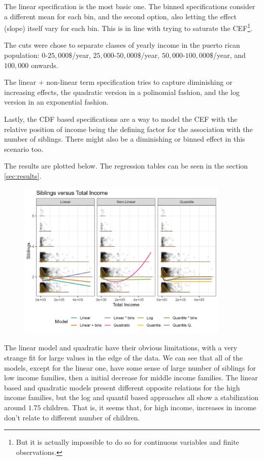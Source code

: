 \documentclass[12pt]{article}
\begin{document}
The linear specification is the most basic one. The binned specifications consider a different mean for each bin, and the second option, also letting the effect (slope) itself vary for each bin. This is in line with trying to saturate the CEF\footnote{But it is actually impossible to do so for continuous variables and finite observations.}.

The cuts were chose to separate classes of yearly income in the puerto rican population: $0$-$25,000\$$/year, $25,000$-$50,000\$$/year, $50,000$-$100,000\$$/year, and $100,000$ onwards.

The linear + non-linear term specification tries to capture diminishing or increasing effects, the quadratic version in a polinomial fashion, and the log version in an exponential fashion.

Lastly, the CDF based specifications are a way to model the CEF with the relative position of income being the defining factor for the association with the number of siblings. There might also be a diminishing or binned effect in this scenario too. 

The results are plotted below. The regression tables can be seen in the section \ref{sec:results}.

\begin{figure}
    \centering
    \includegraphics[width=0.9\textwidth]{Figures/cefs.png}
    \label{fig:cefs}
\end{figure}

The linear model and quadratic have their obvious limitations, with a very strange fit for large values in the edge of the data. We can see that all of the models, except for the linear one, have some sense of large number of siblings for low income families, then a initial decrease for middle income families. The linear based and quadratic models present different opposite relations for the high income families, but the log and quantil based approaches all show a stabilization around $1.75$ children. That is, it seems that, for high income, increases in income don't relate to different number of children.
\end{document}
